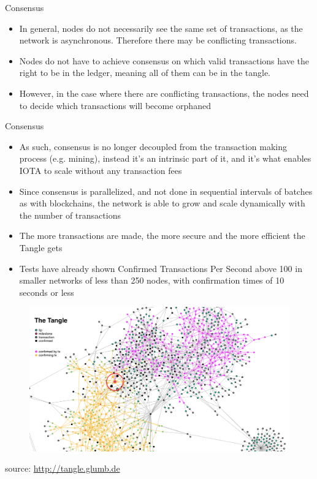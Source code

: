 \documentclass[10pt]{beamer}
\begin{document}
\begin{frame}{Consensus}
	\begin{itemize}
		\item In general, nodes do not necessarily see the same set of transactions, as the network is asynchronous. Therefore there may be conflicting transactions.
		\item Nodes do not have to achieve consensus on which valid transactions have the right to be in the ledger, meaning all of them can be in the tangle.
		\item However, in the case where there are conflicting transactions, the nodes need to decide which transactions will become orphaned
	\end{itemize}
\end{frame}


\begin{frame}{Consensus}
	\begin{itemize}
		\item As such, consensus is no longer decoupled from the transaction making process (e.g. mining), instead it's an intrinsic part of it, and it's what enables IOTA to scale without any transaction fees
		\item Since consensus is parallelized, and not done in sequential intervals of batches as with blockchains, the network is able to grow and scale dynamically with the number of transactions
		\item The more transactions are made, the more secure and the more efficient the Tangle gets
		\item Tests have already shown Confirmed Transactions Per Second above 100 in smaller networks of less than 250 nodes, with confirmation times of 10 seconds or less
	\end{itemize}
\end{frame}


\begin{frame}{}
	\begin{figure}[]
		\centering
		\includegraphics  [scale=0.3]{Images/tangle}
	\end{figure}
	\begin{scriptsize}
		source: \href{http://tangle.glumb.de}{http://tangle.glumb.de}
	\end{scriptsize}
\end{frame}
\end{document}
